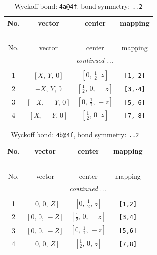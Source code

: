 \documentclass[fleqn,8pt]{jsarticle}
\begin{document}
\begin{longtable}{cccc}
\caption{Wyckoff bond: {\tt 4a@4f}, bond symmetry: {\tt ..2}}
 \\
 \hline \hline
No. & vector & center & mapping \\ \hline \endfirsthead

\multicolumn{3}{l}{\tablename\ \thetable{}} \\
 \hline \hline
No. & vector & center & mapping \\ \hline \endhead

 \hline \hline
\multicolumn{3}{r}{\footnotesize\it continued ...} \\ \endfoot

 \hline \hline
\multicolumn{3}{r}{} \\ \endlastfoot

1 & $\left[ X,\, Y,\, 0 \right]$ & $\left[ 0,\, \frac{1}{2},\, z \right]$ & {\tt [1,-2]} \\ \hline
2 & $\left[ - X,\, Y,\, 0 \right]$ & $\left[ \frac{1}{2},\, 0,\, - z \right]$ & {\tt [3,-4]} \\ \hline
3 & $\left[ - X,\, - Y,\, 0 \right]$ & $\left[ 0,\, \frac{1}{2},\, - z \right]$ & {\tt [5,-6]} \\ \hline
4 & $\left[ X,\, - Y,\, 0 \right]$ & $\left[ \frac{1}{2},\, 0,\, z \right]$ & {\tt [7,-8]} \\
\end{longtable}
\renewcommand{\arraystretch}{1.2}
\begin{longtable}{cccc}
\caption{Wyckoff bond: {\tt 4b@4f}, bond symmetry: {\tt ..2}}
 \\
 \hline \hline
No. & vector & center & mapping \\ \hline \endfirsthead

\multicolumn{3}{l}{\tablename\ \thetable{}} \\
 \hline \hline
No. & vector & center & mapping \\ \hline \endhead

 \hline \hline
\multicolumn{3}{r}{\footnotesize\it continued ...} \\ \endfoot

 \hline \hline
\multicolumn{3}{r}{} \\ \endlastfoot

1 & $\left[ 0,\, 0,\, Z \right]$ & $\left[ 0,\, \frac{1}{2},\, z \right]$ & {\tt [1,2]} \\ \hline
2 & $\left[ 0,\, 0,\, - Z \right]$ & $\left[ \frac{1}{2},\, 0,\, - z \right]$ & {\tt [3,4]} \\ \hline
3 & $\left[ 0,\, 0,\, - Z \right]$ & $\left[ 0,\, \frac{1}{2},\, - z \right]$ & {\tt [5,6]} \\ \hline
4 & $\left[ 0,\, 0,\, Z \right]$ & $\left[ \frac{1}{2},\, 0,\, z \right]$ & {\tt [7,8]} \\
\end{longtable}
\end{document}
